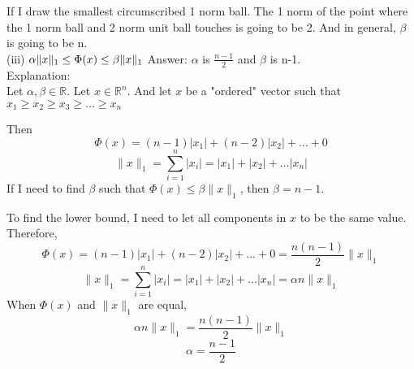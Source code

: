 \documentclass[paper=a4, fontsize=11pt]{scrartcl} %
\numberwithin{equation}{section} %
\numberwithin{figure}{section} %
\numberwithin{table}{section} %
\begin{document}
If I draw the smallest circumscribed 1 norm ball. The 1 norm of the point where the 1 norm ball and 2 norm unit ball touches is going to be 2. And in general, $\beta$ is going to be n. \\

(iii) $\alpha \|x\|_1 \leq \Phi(x) \leq \beta \|x\|_1 \\ $
Answer: $\alpha$ is $\frac{n-1}{2}$ and $\beta$ is n-1.\\
Explanation: \\
Let $\alpha, \beta \in\mathbb{R}$. Let $x \in \mathbb{R}^n$. And let $x$ be a "ordered" vector such that $x_1 \geq x_2 \geq x_3 \geq ... \geq x_n$

Then 
$$
\Phi(x) = (n-1)|x_1| + (n-2)|x_2| + ... + 0
$$
$$
\|x\|_1 = \displaystyle\sum_{i=1}^{n} |x_i| = |x_1| + |x_2| + ... |x_n|
$$
If I need to find $\beta$ such that $\Phi(x) \leq \beta \|x\|_1 $, then $\beta = n - 1$. 

To find the lower bound, I need to let all components in $x$ to be the same value. Therefore, 
$$
\Phi(x) = (n-1)|x_1| + (n-2)|x_2| + ... + 0 
= \frac{n(n-1)}{2} \|x\|_1
$$
$$
\|x\|_1 = \displaystyle\sum_{i=1}^{n} |x_i| = |x_1| + |x_2| + ... |x_n| = \alpha n \|x\|_1
$$
When $\Phi(x)$ and $\|x\|_1$ are equal, 
$$
\alpha n \|x\|_1 = \frac{n(n-1)}{2} \|x\|_1 
$$$$
\alpha = \frac{n-1}{2}
$$
\iffalse
First of all, it is sufficient to consider vectors u with $\|u\|_1 = 1 $, because: 
\begin{align*} 
\alpha \|x\|_1 \leq \|x\|_p \leq \beta \|x\|_1 \\ 
\alpha \leq \frac{\|x\|_p}{\|x\|_1} \leq \beta \|x\|_1\\
\alpha \leq \|\frac{x}{\|x\|_1} \|_p \leq \beta \\ 
\alpha \leq \|u\|_p \leq \beta
\end{align*}

(i) Find tightest constants such that $\alpha \|x\|_1 \leq \|x\|_2 \leq \beta \|x\|_1$

We can simplify this to 
$$
\alpha \leq \|u\|_2 \leq \beta
$$
where $\|u\|_1 = 1$. 

So we want to bound $(\displaystyle\sum_{i =1}^{n} |u_i|^2)^{\frac{1}{2}}$, and we know that $\displaystyle\sum_{i  =1}^{n} |u_i| = 1$. \\ 

Based on the "unit diamond" for 1-norm, $(\displaystyle\sum_{i =1}^{n} |u_i|^2)^{\frac{1}{2}}$ is the largest when one component is one and the others are all zero. Then the 2-norm is 1. On the other hand, $(\displaystyle\sum_{i =1}^{n} |u_i|^2)^{\frac{1}{2}}$ is the smallest if all the component are the same $u_i = 1/n$, then the 2-norm is $\frac{\sqrt{n}}{n}$. 
\fi
\end{document}
